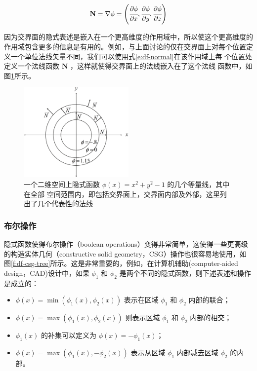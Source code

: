 \begin{equation}
	\mathbf{N}=\nabla\phi=\Biggl(	\cfrac{\partial\phi}{\partial x},\cfrac{\partial\phi}{\partial y},\cfrac{\partial\phi}{\partial z}\Biggl)
\end{equation}

因为交界面的隐式表述是嵌入在一个更高维度的作用域中，所以使这个更高维度的作用域包含更多的信息是有用的。例如，与上面讨论的仅在交界面上对每个位置定义一个单位法线矢量不同，我们可以使用式\ref{e:df-normal}在该作用域上每 个位置处定义一个法线函数 $\mathbf{N}$ ，这样就使得交界面上的法线嵌入在了这个法线 函数中，如图\ref{f:df-surface-normal}所示。

\begin{figure}
	\sidecaption
	\includegraphics[width=0.5\textwidth]{figures/df/gradient-of-implicit-function}
	\caption{一个二维空间上隐式函数 $\phi({x}) = x^{2} + y^{2} − 1$ 的几个等量线，其中在全部 空间范围内，即包括交界面上，交界面内部及外部，这里列出了几个代表性的法线}
	\label{f:df-surface-normal}
\end{figure}



\subsubsection{布尔操作}
隐式函数使得布尔操作（boolean operations）变得非常简单，这使得一些更高级的构造实体几何（constructive solid geometry，CSG）操作也很容易地使用，如图\ref{f:df-csg-tree}所示。这是非常重要的，例如，在计算机辅助(computer-aided design，CAD)设计中，如果 $\phi_1$ 和 $\phi_2$ 是两个不同的隐式函数，则下述表述和操作是成立的：

\begin{itemize}
	\item $\phi({x}) = \min(\phi_1({x}), \phi_2({x}))$ 表示在区域 $\phi_1$ 和 $\phi_2$ 内部的联合；
	\item  $\phi({x}) = \max(\phi_1({x}), \phi_2({x}))$ 则表示区域 $\phi_1$ 和 $\phi_2$ 内部的相交；
	\item $\phi_1({x})$ 的补集可以定义为 $\phi({x}) = −\phi_1({x})$；
	\item $\phi({x}) = \max(\phi_1({x}), −\phi_2({x}))$ 表示从区域 $\phi_1$ 内部减去区域 $\phi_2$ 的内部。
\end{itemize}

